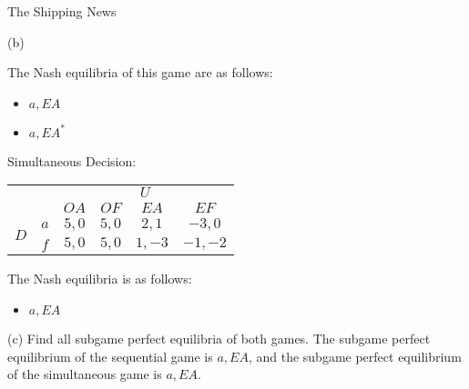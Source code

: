 \documentclass[10pt]{extarticle}
\begin{document}
\begin{problem}{The Shipping News}
\begin{problem}{(b)}
\begin{center}
      \end{center}
      The Nash equilibria of this game are as follows:
      \begin{itemize}
        \item $a,EA$
        \item $a,EA^*$
      \end{itemize}
      Simultaneous Decision:
      \begin{center}
        \small
        \begin{tabular}{cc|c|c|c|c|}
          \multicolumn{2}{c}{} & \multicolumn{4}{c}{$U$}\\
          \multicolumn{2}{c}{} & \multicolumn{1}{c}{$OA$}& \multicolumn{1}{c}{$OF$}& \multicolumn{1}{c}{$EA$}& \multicolumn{1}{c}{$EF$}\\
          \cline{3-6}
          \multirow{2}{*}{$D$} & $a$ & $5,0$& $5,0$ & $2,1$ & $-3,0$\\
          \cline{3-6}
                               & $f$ & $5,0$& $5,0$ & $1,-3$ & $-1,-2$\\
                               \cline{3-6}
        \end{tabular}
      \end{center}
      The Nash equilibria is as follows:
      \begin{itemize}
        \item $a,EA$
      \end{itemize}
    \end{problem}
    \begin{problem}{(c)}
      Find all subgame perfect equilibria of both games.
      \tcblower
      The subgame perfect equilibrium of the sequential game is $a,EA$, and the subgame perfect equilibrium of the simultaneous game is $a,EA$.
    \end{problem}
  \end{problem}
\end{document}
